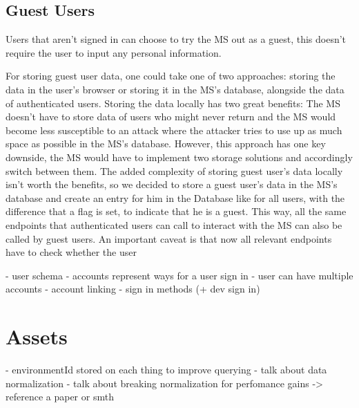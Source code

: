 \subsection{Guest Users}

Users that aren't signed in can choose to try the MS out as a guest, this doesn't require
the user to input any personal information.

For storing guest user data, one could take one of two approaches:
storing the data in the user's browser or storing it in the MS's database, alongside the
data of authenticated users.
Storing the data locally has two great benefits: 
The MS doesn't have to store data of users who might never return and
the MS would become less susceptible to an attack where the attacker tries to use up as
much space as possible in the MS's database.
However, this approach has one key downside, the MS would have to implement two storage
solutions and accordingly switch between them.
The added complexity of storing guest user's data locally isn't worth the benefits, so we
decided to store a guest user's data in the MS's database and create an entry for him in
the Database like for all users, with the difference that a flag is set, to indicate that
he is a guest.
This way, all the same endpoints that authenticated users can call to interact with the MS
can also be called by guest users.
An important caveat is that now all relevant endpoints have to check whether the user 




- user schema
- accounts represent ways for a user sign in
- user can have multiple accounts
- account linking
- sign in methods (+ dev sign in)





\section{Assets}

- environmentId stored on each thing to improve querying
- talk about data normalization
- talk about breaking normalization for perfomance gains -> reference a paper or smth

